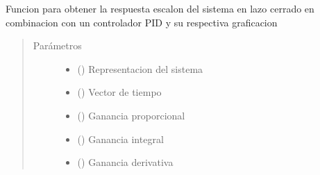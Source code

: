 \documentclass[letterpaper,10pt,spanish]{sphinxmanual}
\begin{document}
\begin{fulllineitems}
\label{\detokenize{codigos/rutinas_PID:rutinas_PID.rutina_step_plot}}
Funcion para obtener la respuesta escalon del sistema en lazo cerrado en combinacion con un controlador PID y su respectiva graficacion
\begin{quote}\begin{description}
\item[{Parámetros}] \leavevmode\begin{itemize}
\item {} 
 () \textendash{} Representacion del sistema

\item {} 
 () \textendash{} Vector de tiempo

\item {} 
 () \textendash{} Ganancia proporcional

\item {} 
 () \textendash{} Ganancia integral

\item {} 
 () \textendash{} Ganancia derivativa

\end{itemize}

\end{description}\end{quote}

\end{fulllineitems}

\end{document}
